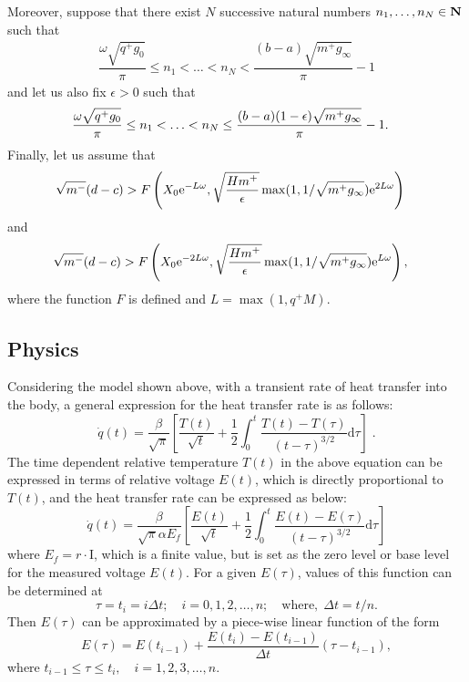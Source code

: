 \documentclass[twocolumn]{svjour3}          %
\begin{document}
Moreover, suppose that there exist $N$ successive natural numbers
$n_1,\ldots , n_N\in {{\bf N}}$ such that
\begin{eqnarray} \label{gap}
    \dfrac{\omega \sqrt{q^+g_0}}{\pi}\leq n_1<\ldots <n_N<
      \dfrac{(b-a)\sqrt{m^+ g_\infty}}{\pi}-1
\end{eqnarray}
and let us also fix $\epsilon>0$ such that
\begin{align} \label{ipoepsilon}
    \dfrac{\omega \sqrt{q^+g_0}}{\pi}&\leq n_1<\ldots <n_N
    \columncase{}{\nonumber\\&}
    \leq \dfrac{(b-a)(1-\epsilon)\sqrt{m^+ g_\infty}}{\pi}-1.
\end{align}
Finally, let us assume that
\begin{align} \label{ipoq1}
\sqrt{m^-}&(d-c)  \columncase{>}{\nonumber\\>&}
F \left(X_0 {\mathrm{e}}^{-L \omega },
                 \sqrt{\dfrac{Hm^+}{\epsilon}}\max(1,1/\sqrt{m^+ g_\infty}) {\mathrm{e}}^{2L\omega }\right)
\end{align}
and
\begin{align} \label{ipoq2}
\sqrt{m^-}&(d-c)\columncase{>}{\nonumber\\>&}
F\left(X_0 {\mathrm{e}}^{-2L\omega },
                  \sqrt{\dfrac{Hm^+}{\epsilon}}\max(1,1/\sqrt{m^+ g_\infty}){\mathrm{e}}^{L\omega }\right),
\end{align}
where the function $F$ is defined and $L=\max(1,q^+M)$.

\subsection{Physics}

Considering the model shown above, with a transient
rate of heat transfer into the body, a general expression for the heat transfer
rate is as follows:
\begin{equation}
\dot{q}(t) = \frac{\beta}{\sqrt{\pi}}\left[ \frac{T(t)}{\sqrt{t}}
+ \frac{1}{2}\int_0^t\frac{T(t)-T(\tau)}{(t-\tau)^{3/2}}{\mathrm{d}}\tau
\right]\; . \label{eqn:D}
\end{equation}
The time dependent relative temperature $T(t)$ in the above equation can be expressed in terms of relative voltage $E(t)$, which is directly proportional to $T(t)$, and the heat transfer rate can be expressed as below:
\begin{equation}
\dot{q}(t) = \frac{\beta}{\sqrt{\pi} \alpha E_f}\left[
\frac{E(t)}{\sqrt{t}} +
\frac{1}{2}\int_0^t\frac{E(t)-E(\tau)}{(t-\tau)^{3/2}}{\mathrm{d}}\tau
\right] \label{eqn:E}
\end{equation}
where $E_f=r\cdot$I, which is a finite value, but is set as the zero level or base level for the measured voltage $E(t)$.
For a given $E(\tau)$, values of this function can be determined at
\[
 \tau = t_i = i\Delta t;\quad i=0,1,2, \ldots ,n;\quad \textrm{where},\; \Delta t = t/n.
\]
Then $E(\tau)$ can be approximated by a piece-wise linear function of the form
\begin{equation}
E(\tau) = E(t_{i-1}) + \frac{E(t_i) - E(t_{i-1})} {\Delta t}(\tau - t_{i-1}),
\label{eqn:F}
\end{equation}
where $t_{i-1} \le \tau \le t_i,\quad i=1,2,3, \ldots ,n$.
\end{document}
